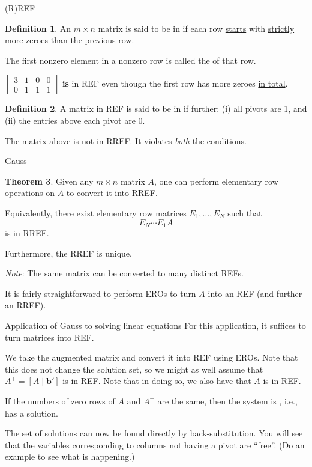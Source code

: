 \documentclass[dvipsnames]{beamer}
\theoremstyle{definition}
\newtheorem{thm}{Theorem}
\newtheorem{defn}[thm]{Definition}
\begin{document}
\begin{frame}{(R)REF}
    \begin{defn}
         An $m \times n$ matrix is said to be in  if \newline
         each row \underline{starts} with \underline{strictly} more zeroes than the previous row. \pause

         The first nonzero element in a nonzero row is called the  of that row.
     \end{defn} \pause
    $\begin{bmatrix}
        \boxed{3} & 1 & 0 & 0 \\
        0 & \boxed{1} & 1 & 1
    \end{bmatrix}$ \pause \textbf{is} in REF even though the first row has more zeroes \underline{in total}. \pause

    \begin{defn}
        A matrix in REF is said to be in  if further: \pause (i) all pivots are 1, \pause and (ii) the entries above each pivot are $0$.
    \end{defn} \pause

    The matrix above is not in RREF. \pause It violates \emph{both} the conditions.
\end{frame}
\begin{frame}{Gauss}
    \begin{thm}
        Given any $m \times n$ matrix $A$, one can perform elementary row operations on $A$ to convert it into RREF. \pause

        Equivalently, there exist elementary row matrices $E_{1}, \ldots, E_{N}$ such that
        \begin{equation*} 
            E_{N} \cdots E_{1} A
        \end{equation*}
        is in RREF. \pause

        Furthermore, the RREF is unique.
    \end{thm} \pause
    \emph{Note}: The same matrix can be converted to many distinct REFs. \pause

    It is fairly straightforward to perform EROs to turn $A$ into an REF (and further an RREF).
\end{frame}
\begin{frame}{Application of Gauss to solving linear equations}
    For this application, it suffices to turn matrices into REF. \pause

    We take the augmented matrix and convert it into REF using EROs. \pause Note that this does not change the solution set, so we might as well assume that $A^{+} = [A \mid \mathbf{b}']$ is in REF. \pause 
    Note that in doing so, we also have that $A$ is in REF. \pause

    If the numbers of zero rows of $A$ and $A^{+}$ are the same, then the system is , i.e., has a solution. \pause
    
    The set of solutions can now be found directly by back-substitution. \pause You will see that the variables corresponding to columns not having a pivot are ``free''. \pause (Do an example to see what is happening.) 
\end{frame}
\end{document}
